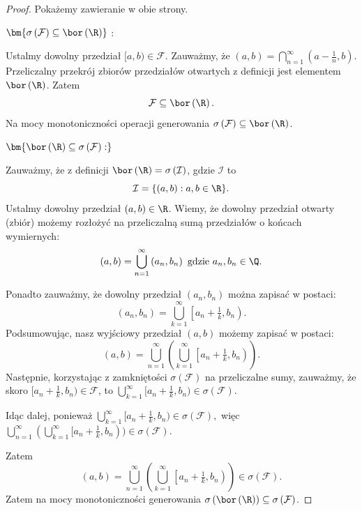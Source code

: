 \begin{proof}
	Pokażemy zawieranie w obie strony.

	\noindent$\bm{ \sigma\left( \mathcal{F} \right)  \subseteq \bor\left(\R\right) }$ :

	Ustalmy dowolny przedział $[a,b)\in \mathcal{F}$. Zauważmy, że $\left( a,b \right) = \bigcap_{n=1} ^{\infty}\left( a - \frac{1}{n},b \right)$. Przeliczalny przekrój zbiorów przedziałów otwartych z definicji jest elementem $\bor\left(\R\right) $. Zatem \[
	\mathcal{F}\subseteq \bor\left(\R\right) 
	.\] 
	Na mocy monotoniczności operacji generowania $\sigma\left( \mathcal{F} \right) \subseteq \bor\left(\R\right) $.

	\noindent$\bm{ \bor\left(\R\right)  \subseteq \sigma\left( \mathcal{F} \right):}$ 

	Zauważmy, że z definicji $\bor\left(\R\right) = \sigma\left( \mathcal{I} \right) $, gdzie $\mathcal{I}$ to 
	\[
	\mathcal{I} = \{\left( a,b \right) : a,b \in \R\} 
	.\] 
	Ustalmy dowolny przedział $\left( a,b \right) \in \R$. Wiemy, że dowolny przedział otwarty (zbiór) możemy rozłożyć na przeliczalną sumą przedziałów o końcach wymiernych:
	\[
		\left( a,b \right) = \bigcup_{n=1} ^{\infty}\left( a_{n},b_{n} \right) \text{ gdzie } a_{n},b_{n}\in \Q
	.\] 

	Ponadto zauważmy, że dowolny przedział $\left( a_{n},b_{n} \right) $ można zapisać w postaci:
	\[
		\left( a_{n},b_{n} \right) = \bigcup_{k=1} ^{\infty} \left[a_{n}+\tfrac{1}{k}, b_{n}\right)
	.\] 
	Podsumowując, nasz wyjściowy przedział $\left( a,b \right) $ możemy zapisać w postaci:
	\[
		\left( a,b \right) = \bigcup_{n=1}^{\infty}\left( \bigcup_{k=1} ^{\infty} \left[a_{n}+ \tfrac{1}{k}, b_{n}\right) \right)  
	.\] 
	Następnie, korzystając z zamkniętości $\sigma\left( \mathcal{F} \right) $ na przeliczalne sumy, zauważmy, że skoro $[a_{n}+ \tfrac{1}{k}, b_{n})\in \mathcal{F}$, to $\bigcup_{k=1} ^{\infty} [a_{n}+ \tfrac{1}{k}, b_{n}) \in \sigma\left( \mathcal{F} \right).$ 

\noindent Idąc dalej, ponieważ $\bigcup_{k=1} ^{\infty} [a_{n}+ \tfrac{1}{k}, b_{n}) \in \sigma\left( \mathcal{F} \right),$ więc $\bigcup_{n=1}^{\infty}( \bigcup_{k=1} ^{\infty} [a_{n}+ \tfrac{1}{k}, b_{n})) \in \sigma\left( \mathcal{F} \right) .$ 

\noindent Zatem 
\[
		\left( a,b \right) = \bigcup_{n=1}^{\infty}\left( \bigcup_{k=1} ^{\infty} \left[a_{n}+ \tfrac{1}{k}, b_{n}\right) \right)  \in \sigma\left( \mathcal{F} \right) 
.\] 
Zatem na mocy monotoniczności generowania $\sigma\left( \bor\left(\R\right)  \right) \subseteq \sigma\left( \mathcal{F} \right) $.
\end{proof} 
